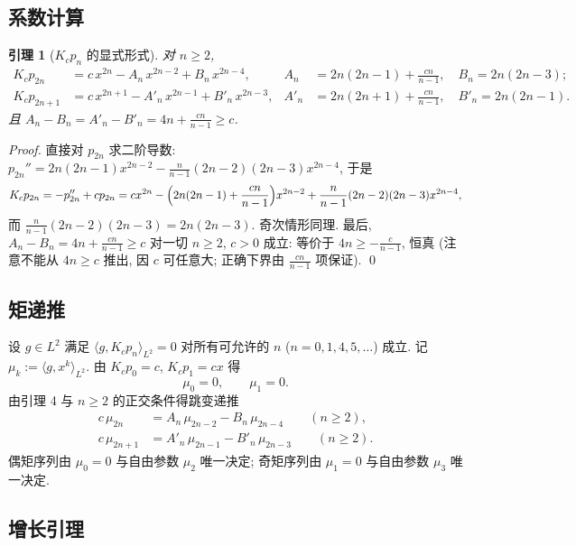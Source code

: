 \documentclass[UTF8]{ctexart}
\newtheorem{lemma}[theorem]{引理}
\begin{document}
\subsection{系数计算}

\begin{lemma}[\texorpdfstring{$K_c p_n$}{Kc pn} 的显式形式]
对 $n \geq 2$,
\begin{align}
	K_c p_{2n} &= c\, x^{2n} - A_n\, x^{2n-2} + B_n\, x^{2n-4},
	&
	A_n &= 2n(2n-1) + \frac{cn}{n-1}, \quad B_n = 2n(2n-3); \\
	K_c p_{2n+1} &= c\, x^{2n+1} - A'_n\, x^{2n-1} + B'_n\, x^{2n-3},
	&
	A'_n &= 2n(2n+1) + \frac{cn}{n-1}, \quad B'_n = 2n(2n-1).
\end{align}
且 $A_n - B_n = A'_n - B'_n = 4n + \frac{cn}{n-1} \geq c$.
\end{lemma}

\begin{proof}
直接对 $p_{2n}$ 求二阶导数: $p_{2n}'' = 2n(2n-1)x^{2n-2}
- \frac{n}{n-1}(2n-2)(2n-3)x^{2n-4}$, 于是
\[
	K_c p_{2n} = -p_{2n}'' + c p_{2n}
	= c x^{2n} - \Bigl( 2n(2n-1) + \frac{cn}{n-1} \Bigr) x^{2n-2}
	+ \frac{n}{n-1}(2n-2)(2n-3) x^{2n-4},
\]
而 $\frac{n}{n-1}(2n-2)(2n-3) = 2n(2n-3)$. 奇次情形同理.
最后, $A_n - B_n = 4n + \frac{cn}{n-1} \geq c$ 对一切 $n \geq 2$, $c > 0$
成立: 等价于 $4n \geq -\frac{c}{n-1}$, 恒真 (注意不能从 $4n \geq c$ 推出,
因 $c$ 可任意大; 正确下界由 $\frac{cn}{n-1}$ 项保证). \qed
\end{proof}

\subsection{矩递推}

设 $g \in L^2$ 满足 $\langle g, K_c p_n \rangle_{L^2} = 0$ 对所有可允许的 $n$
($n = 0, 1, 4, 5, \dots$) 成立. 记 $\mu_k := \langle g, x^k \rangle_{L^2}$.
由 $K_c p_0 = c$, $K_c p_1 = cx$ 得
\begin{equation}
	\mu_0 = 0, \qquad \mu_1 = 0 .
\end{equation}
由引理 4 与 $n \geq 2$ 的正交条件得跳变递推
\begin{align}
	c\, \mu_{2n} &= A_n\, \mu_{2n-2} - B_n\, \mu_{2n-4} \qquad (n \geq 2), \\
	c\, \mu_{2n+1} &= A'_n\, \mu_{2n-1} - B'_n\, \mu_{2n-3} \qquad (n \geq 2).
\end{align}
偶矩序列由 $\mu_0 = 0$ 与自由参数 $\mu_2$ 唯一决定; 奇矩序列由
$\mu_1 = 0$ 与自由参数 $\mu_3$ 唯一决定.

\subsection{增长引理}
\end{document}
